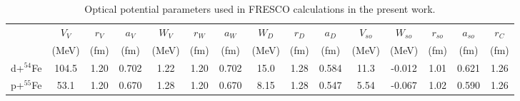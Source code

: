 \begin{table}
  \caption{\label{tab:omps} Optical potential parameters used in FRESCO calculations in the present work.}
  \begin{tabular}{ccccccccccccccc}\hline\hline
             & $V_V$ & $r_V$ & $a_V$& $W_V$ & $r_W$ & $a_W$ & $W_D$ & $r_D$ & $a_D$ & $V_{so}$ & $W_{so}$ & $r_{so}$ & $a_{so}$ & $r_C$  \\
             & (MeV) & (fm) & (fm)  & (MeV) & (fm)  & (fm)  & (MeV)& (fm)  & (fm)  & (MeV)   & (MeV)    & (fm)     & (fm)    & (fm)   \\\hline
    d+$^{54}$Fe & 104.5 & 1.20 & 0.702 & 1.22  & 1.20  & 0.702 & 15.0 & 1.28  & 0.584 & 11.3    & -0.012   & 1.01     & 0.621   & 1.26   \\
    p+$^{55}$Fe &  53.1 & 1.20 & 0.670 & 1.28  & 1.20  & 0.670 & 8.15 & 1.28  & 0.547 & 5.54    & -0.067   & 1.02     & 0.590   & 1.26   \\\hline\hline
  \end{tabular}
\end{table}
